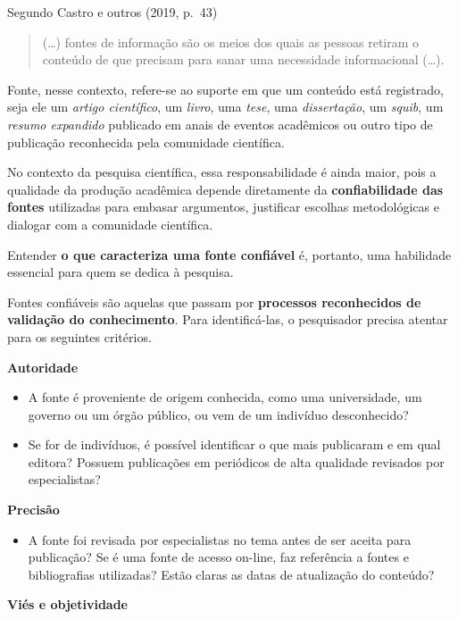 \documentclass[
  letterpaper,
  DIV=11,
  numbers=noendperiod]{scrreprt}
\providecommand{\tightlist}{%
  \setlength{\itemsep}{0pt}\setlength{\parskip}{0pt}}
\begin{document}
Segundo Castro e outros (2019, p.~43)

\begin{quote}
(\ldots) fontes de informação são os meios dos quais as pessoas retiram
o conteúdo de que precisam para sanar uma necessidade informacional
(\ldots).
\end{quote}

Fonte, nesse contexto, refere-se ao suporte em que um conteúdo está
registrado, seja ele um \emph{artigo científico}, um \emph{livro}, uma
\emph{tese}, uma \emph{dissertação}, um \emph{squib}, um \emph{resumo
expandido} publicado em anais de eventos acadêmicos ou outro tipo de
publicação reconhecida pela comunidade científica.

No contexto da pesquisa científica, essa responsabilidade é ainda maior,
pois a qualidade da produção acadêmica depende diretamente da
\textbf{confiabilidade das fontes} utilizadas para embasar argumentos,
justificar escolhas metodológicas e dialogar com a comunidade
científica.

Entender \textbf{o que caracteriza uma fonte confiável} é, portanto, uma
habilidade essencial para quem se dedica à pesquisa.

Fontes confiáveis são aquelas que passam por \textbf{processos
reconhecidos de validação do conhecimento}. Para identificá-las, o
pesquisador precisa atentar para os seguintes critérios.

\textbf{Autoridade}

\begin{itemize}
\item
  A fonte é proveniente de origem conhecida, como uma universidade, um
  governo ou um órgão público, ou vem de um indivíduo desconhecido?
\item
  Se for de indivíduos, é possível identificar o que mais publicaram e
  em qual editora? Possuem publicações em periódicos de alta qualidade
  revisados por especialistas?
\end{itemize}

\textbf{Precisão}

\begin{itemize}
\tightlist
\item
  A fonte foi revisada por especialistas no tema antes de ser aceita
  para publicação? Se é uma fonte de acesso on-line, faz referência a
  fontes e bibliografias utilizadas? Estão claras as datas de
  atualização do conteúdo?
\end{itemize}

\textbf{Viés e objetividade}
\end{document}
